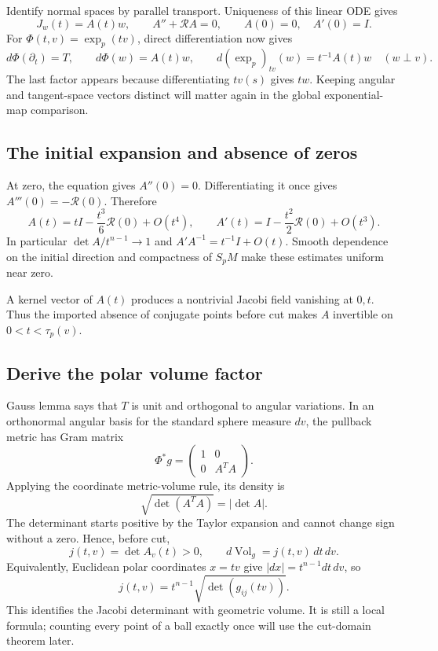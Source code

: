 \documentclass[12pt,reqno]{amsart}
\begin{document}
Identify normal spaces by parallel transport. Uniqueness of this linear ODE gives
\[
J_w(t)=A(t)w,
\qquad A''+\mathcal RA=0,\qquad A(0)=0,\quad A'(0)=I.
\]
For \(\Phi(t,v)=\exp_p(tv)\), direct differentiation now gives
\[
d\Phi(\partial_t)=T,\qquad d\Phi(w)=A(t)w,
\qquad d(\exp_p)_{tv}(w)=t^{-1}A(t)w\quad(w\perp v).
\]
The last factor appears because differentiating \(tv(s)\) gives \(tw\). Keeping angular and tangent-space vectors distinct will matter again in the global exponential-map comparison.

\subsection{The initial expansion and absence of zeros}
At zero, the equation gives \(A''(0)=0\). Differentiating it once gives \(A'''(0)=-\mathcal R(0)\). Therefore
\[
A(t)=tI-\frac{t^3}{6}\mathcal R(0)+O(t^4),
\qquad A'(t)=I-\frac{t^2}{2}\mathcal R(0)+O(t^3).
\]
In particular \(\det A/t^{n-1}\to1\) and \(A'A^{-1}=t^{-1}I+O(t)\). Smooth dependence on the initial direction and compactness of \(S_pM\) make these estimates uniform near zero.

A kernel vector of \(A(t)\) produces a nontrivial Jacobi field vanishing at \(0,t\). Thus the imported absence of conjugate points before cut makes \(A\) invertible on \(0<t<\tau_p(v)\).

\subsection{Derive the polar volume factor}
Gauss lemma says that \(T\) is unit and orthogonal to angular variations. In an orthonormal angular basis for the standard sphere measure \(dv\), the pullback metric has Gram matrix
\[
\Phi^*g=\begin{pmatrix}1&0\\0&A^TA\end{pmatrix}.
\]
Applying the coordinate metric-volume rule, its density is
\[
\sqrt{\det(A^TA)}=|\det A|.
\]
The determinant starts positive by the Taylor expansion and cannot change sign without a zero. Hence, before cut,
\[
j(t,v)=\det A_v(t)>0,\qquad d\operatorname{Vol}_g=j(t,v)\,dt\,dv.
\]
Equivalently, Euclidean polar coordinates \(x=tv\) give \(|dx|=t^{n-1}dt\,dv\), so
\[
j(t,v)=t^{n-1}\sqrt{\det(g_{ij}(tv))}.
\]
This identifies the Jacobi determinant with geometric volume. It is still a local formula; counting every point of a ball exactly once will use the cut-domain theorem later.
\end{document}

